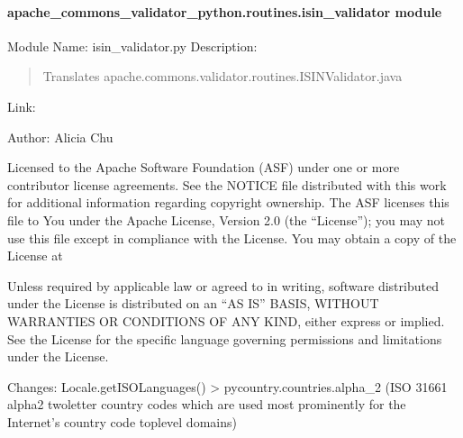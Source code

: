 \documentclass[letterpaper,10pt,english]{sphinxmanual}
\begin{document}
\paragraph{apache\_commons\_validator\_python.routines.isin\_validator module}
\label{\detokenize{apache_commons_validator_python.routines:module-apache_commons_validator_python.routines.isin_validator}}\label{\detokenize{apache_commons_validator_python.routines:apache-commons-validator-python-routines-isin-validator-module}}
\sphinxAtStartPar
Module Name: isin\_validator.py
Description:
\begin{quote}

\sphinxAtStartPar
Translates apache.commons.validator.routines.ISINValidator.java
\end{quote}

\sphinxAtStartPar
Link: 

\sphinxAtStartPar
Author: Alicia Chu
\begin{description}
\sphinxAtStartPar
Licensed to the Apache Software Foundation (ASF) under one or more contributor license agreements.
See the NOTICE file distributed with this work for additional information regarding copyright ownership.
The ASF licenses this file to You under the Apache License, Version 2.0 (the “License”);
you may not use this file except in compliance with the License. You may obtain a copy of the License at

\sphinxAtStartPar
{}

\sphinxAtStartPar
Unless required by applicable law or agreed to in writing, software distributed under the License is
distributed on an “AS IS” BASIS, WITHOUT WARRANTIES OR CONDITIONS OF ANY KIND, either express or implied.
See the License for the specific language governing permissions and limitations under the License.

\end{description}

\sphinxAtStartPar
Changes:
\sphinxhyphen{} Locale.getISOLanguages() \sphinxhyphen{}\textgreater{} pycountry.countries.alpha\_2 (ISO 3166\sphinxhyphen{}1 alpha\sphinxhyphen{}2 \textendash{} two\sphinxhyphen{}letter country codes which are used most prominently for the Internet’s country code top\sphinxhyphen{}level domains)
\end{document}

